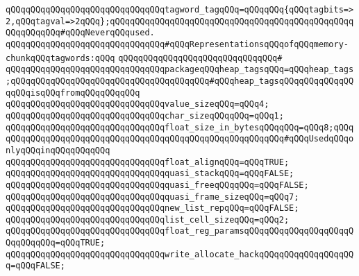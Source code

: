 \verb|qQQqqQQqqQQqqQQqqQQqqQQqqQQqqQQqtagword_tagqQQq=qQQqqQQq{qQQqtagbits=>2,qQQqtagval=>2qQQq};qQQqqQQqqQQqqQQqqQQqqQQqqQQqqQQqqQQqqQQqqQQqqQQqqQQqqQQqqQQq#qQQqNeverqQQqused.|\newline
\newline
\verb|qQQqqQQqqQQqqQQqqQQqqQQqqQQqqQQq#qQQqRepresentationsqQQqofqQQqmemory-chunkqQQqtagwords:qQQq|\newline
\verb|qQQqqQQqqQQqqQQqqQQqqQQqqQQqqQQq#|\newline
\verb|qQQqqQQqqQQqqQQqqQQqqQQqqQQqqQQqpackageqQQqheap_tagsqQQq=qQQqheap_tags;qQQqqQQqqQQqqQQqqQQqqQQqqQQqqQQqqQQqqQQq#qQQqheap_tagsqQQqqQQqqQQqqQQqqQQqisqQQqfromqQQqqQQqqQQq|\newline
\newline
\verb|qQQqqQQqqQQqqQQqqQQqqQQqqQQqqQQqvalue_sizeqQQq=qQQq4;|\newline
\verb|qQQqqQQqqQQqqQQqqQQqqQQqqQQqqQQqchar_sizeqQQqqQQq=qQQq1;|\newline
\verb|qQQqqQQqqQQqqQQqqQQqqQQqqQQqqQQqfloat_size_in_bytesqQQqqQQq=qQQq8;qQQqqQQqqQQqqQQqqQQqqQQqqQQqqQQqqQQqqQQqqQQqqQQqqQQqqQQqqQQq#qQQqUsedqQQqonlyqQQqinqQQqqQQqqQQq|\newline
\verb|qQQqqQQqqQQqqQQqqQQqqQQqqQQqqQQqfloat_alignqQQq=qQQqTRUE;|\newline
\newline
\verb|qQQqqQQqqQQqqQQqqQQqqQQqqQQqqQQqquasi_stackqQQq=qQQqFALSE;|\newline
\verb|qQQqqQQqqQQqqQQqqQQqqQQqqQQqqQQqquasi_freeqQQqqQQq=qQQqFALSE;|\newline
\verb|qQQqqQQqqQQqqQQqqQQqqQQqqQQqqQQqquasi_frame_sizeqQQq=qQQq7;|\newline
\newline
\verb|qQQqqQQqqQQqqQQqqQQqqQQqqQQqqQQqnew_list_repqQQq=qQQqFALSE;|\newline
\verb|qQQqqQQqqQQqqQQqqQQqqQQqqQQqqQQqlist_cell_sizeqQQq=qQQq2;|\newline
\newline
\verb|qQQqqQQqqQQqqQQqqQQqqQQqqQQqqQQqfloat_reg_paramsqQQqqQQqqQQqqQQqqQQqqQQqqQQqqQQq=qQQqTRUE;|\newline
\verb|qQQqqQQqqQQqqQQqqQQqqQQqqQQqqQQqwrite_allocate_hackqQQqqQQqqQQqqQQqqQQq=qQQqFALSE;|\newline
